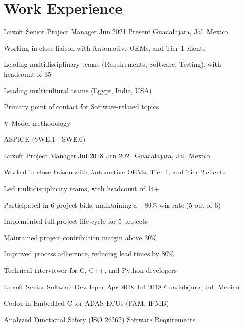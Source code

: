 
\section{Work Experience}

\job
    {Luxoft}
    {Senior Project Manager}
    {Jun 2021}
    {Present}
    {Guadalajara, Jal. Mexico}
    {
        \begin{itemize-bullets}
            \item{Working in close liaison with Automotive OEMs, and Tier 1 clients}
            \item{Leading multidisciplinary teams (Requirements, Software, Testing), with headcount of 35+}
            \item{Leading multicultural teams (Egypt, India, USA)}
            \item{Primary point of contact for Software-related topics}
            \item{V-Model methodology}
            \item{ASPICE (SWE.1 - SWE.6)}
        \end{itemize-bullets}
    }


\job
    {Luxoft}
    {Project Manager}
    {Jul 2018}
    {Jun 2021}
    {Guadalajara, Jal. Mexico}
    {
        \begin{itemize-bullets}
            \item{Worked in close liaison with Automotive OEMs, Tier 1, and Tier 2 clients}
            \item{Led multidisciplinary teams, with headcount of 14+}
            \item{Participated in 6 project bids, maintaining a +80\% win rate (5 out of 6)}
            \item{Implemented full project life cycle for 5 projects}
            \item{Maintained project contribution margin above 30\% }
            \item{Improved process adherence, reducing lead times by 80\%}
            \item{Technical interviewer for C, C++, and Python developers}
        \end{itemize-bullets}
    }

\job
    {Luxoft}
    {Senior Software Developer}
    {Apr 2018}
    {Jul 2018}
    {Guadalajara, Jal. Mexico}
    {
        \begin{itemize-bullets}
            \item{Coded in Embedded C for ADAS ECUs (PAM, IPMB)}
            \item{Analyzed Functional Safety (ISO 26262) Software Requirements}
        \end{itemize-bullets}
    }

